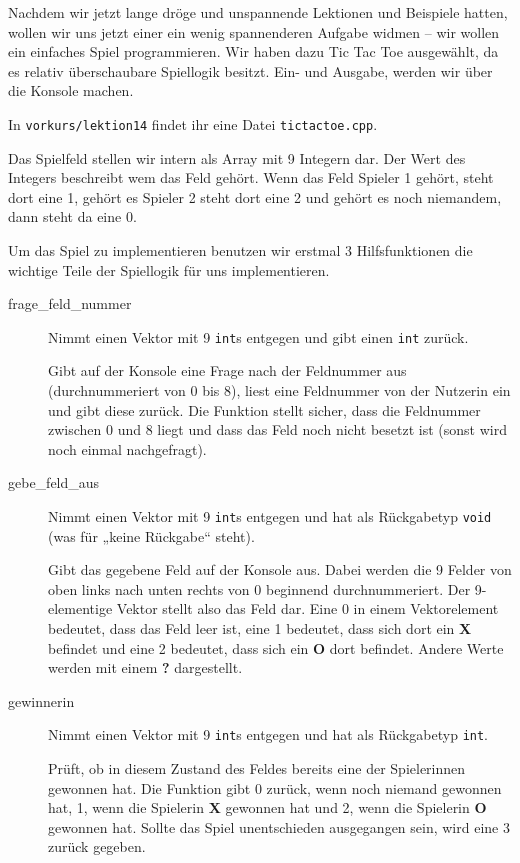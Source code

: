
Nachdem wir jetzt lange dröge und unspannende Lektionen und Beispiele hatten, wollen wir uns jetzt einer
ein wenig spannenderen Aufgabe widmen -- wir wollen ein
einfaches Spiel programmieren. Wir haben dazu Tic Tac Toe ausgewählt, da es
relativ überschaubare Spiellogik besitzt. Ein- und Ausgabe, werden wir über die
Konsole machen.

In \texttt{vorkurs/lektion14} findet ihr eine Datei \texttt{tictactoe.cpp}. 

Das Spielfeld stellen wir intern als Array mit 9 Integern dar. Der Wert des Integers beschreibt wem das Feld gehört. 
Wenn das Feld Spieler 1 gehört, steht dort eine 1, gehört es Spieler 2 steht dort eine 2 und gehört es noch niemandem, 
dann steht da eine 0.

Um das Spiel zu implementieren benutzen wir erstmal 3 Hilfsfunktionen die wichtige Teile der Spiellogik für uns
implementieren.

\begin{description}
	\item[frage\_feld\_nummer]
	      Nimmt einen Vektor mit 9 \texttt{int}s entgegen und gibt einen \texttt{int} zurück.

	      Gibt auf der Konsole eine Frage nach der Feldnummer aus (durchnummeriert von 0 bis 8), liest eine Feldnummer von der Nutzerin ein und gibt diese zurück.
	      Die Funktion stellt sicher, dass die Feldnummer zwischen 0 und 8 liegt und dass das Feld noch nicht besetzt ist (sonst wird noch einmal nachgefragt).
	\item[gebe\_feld\_aus]
	      Nimmt einen Vektor mit 9 \texttt{int}s entgegen und hat als Rückgabetyp \texttt{void} (was für „keine Rückgabe“ steht).

	      Gibt das gegebene Feld auf der Konsole aus. Dabei werden die 9 Felder von oben links nach unten rechts von 0 beginnend durchnummeriert.
	      Der 9-elementige Vektor stellt also das Feld dar.
	      Eine 0 in einem Vektorelement bedeutet, dass das Feld leer ist, eine 1 bedeutet, dass sich dort ein \textbf{X} befindet und eine 2 bedeutet, dass sich ein \textbf{O} dort befindet.
	      Andere Werte werden mit einem \textbf{?} dargestellt.
	\item[gewinnerin]
	      Nimmt einen Vektor mit 9 \texttt{int}s entgegen und hat als Rückgabetyp \texttt{int}.

	      Prüft, ob in diesem Zustand des Feldes bereits eine der Spielerinnen gewonnen hat.
	      Die Funktion gibt 0 zurück, wenn noch niemand gewonnen hat, 1, wenn die Spielerin \textbf{X} gewonnen hat und 2, wenn die Spielerin \textbf{O} gewonnen hat.
	      Sollte das Spiel unentschieden ausgegangen sein, wird eine 3 zurück gegeben.
\end{description}



